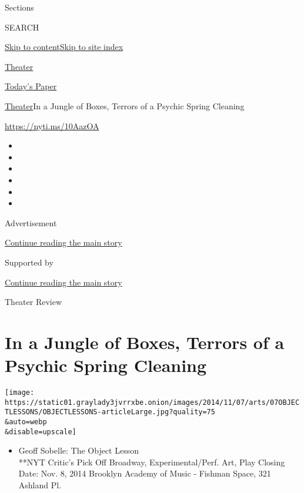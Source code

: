Sections

SEARCH

\protect\hyperlink{site-content}{Skip to
content}\protect\hyperlink{site-index}{Skip to site index}

\href{https://www.nytimes3xbfgragh.onion/section/theater}{Theater}

\href{https://myaccount.nytimes3xbfgragh.onion/auth/login?response_type=cookie\&client_id=vi}{}

\href{https://www.nytimes3xbfgragh.onion/section/todayspaper}{Today's
Paper}

\href{/section/theater}{Theater}\textbar{}In a Jungle of Boxes, Terrors
of a Psychic Spring Cleaning

\url{https://nyti.ms/10AazOA}

\begin{itemize}
\item
\item
\item
\item
\item
\item
\end{itemize}

Advertisement

\protect\hyperlink{after-top}{Continue reading the main story}

Supported by

\protect\hyperlink{after-sponsor}{Continue reading the main story}

Theater Review

\hypertarget{in-a-jungle-of-boxes-terrors-of-a-psychic-spring-cleaning}{%
\section{In a Jungle of Boxes, Terrors of a Psychic Spring
Cleaning}\label{in-a-jungle-of-boxes-terrors-of-a-psychic-spring-cleaning}}

\texttt{[image: https://static01.graylady3jvrrxbe.onion/images/2014/11/07/arts/07OBJECTLESSONS/OBJECTLESSONS-articleLarge.jpg?quality=75\\\&auto=webp\\\&disable=upscale]}

\begin{itemize}
\tightlist
\item
  Geoff Sobelle: The Object Lesson\\
  **NYT Critic's Pick Off Broadway, Experimental/Perf. Art, Play Closing
  Date: Nov. 8, 2014 Brooklyn Academy of Music - Fishman Space, 321
  Ashland Pl.
\end{itemize}

